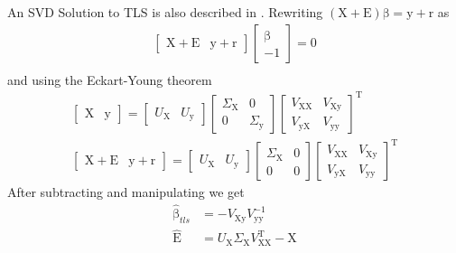 \documentclass[10pt,a4paper]{article}
\newcommand{\boldvec}[1]{\boldsymbol{\mathrm{#1}}}
\let\vec\boldvec
\newcommand{\designMat}{\vec{X}} %
\newcommand{\observations}{\vec{y}} %
\newcommand{\param}{\vec{\beta}} %
\newcommand{\residual}{\vec{r}} %
\newcommand{\errorMat}{\vec{E}} %
\begin{document}
An SVD Solution to TLS is also described in \cite{Golub80}. Rewriting $(\designMat + \errorMat)\param = \observations + \residual$ as  
%
\begin{equation}
\begin{aligned}
\begin{bmatrix} \designMat + \errorMat & \observations + \residual \end{bmatrix} \begin{bmatrix} \param \\ -1 \end{bmatrix} = 0 \\
\end{aligned}
\end{equation}
%
and using the Eckart-Young theorem
\begin{equation}
\begin{aligned}
\begin{bmatrix} \designMat & \observations \end{bmatrix} = \begin{bmatrix} U_{\designMat} & U_{\observations} \end{bmatrix} \begin{bmatrix} \Sigma_{\designMat} & 0 \\ 0 & \Sigma_{\observations} \end{bmatrix} \begin{bmatrix} V_{\designMat \designMat} & V_{\designMat \observations} \\ V_{\observations \designMat} & V_{\observations \observations} \end{bmatrix}^{\mathrm{T}} \\
\begin{bmatrix} \designMat + \errorMat & \observations + \residual \end{bmatrix} = \begin{bmatrix} U_{\designMat} & U_{\observations} \end{bmatrix} \begin{bmatrix} \Sigma_{\designMat} & 0 \\ 0 & 0 \end{bmatrix} \begin{bmatrix} V_{\designMat \designMat} & V_{\designMat \observations} \\ V_{\observations \designMat} & V_{\observations \observations} \end{bmatrix}^{\mathrm{T}}
\end{aligned}
\end{equation}
% 
After subtracting and manipulating we get
%
\begin{equation}
\begin{aligned}
\hat{\param}_{tls} &= -V_{\designMat \observations}V_{\observations \observations}^{-1} \\
\hat{\errorMat} &= U_{\designMat} \Sigma_{\designMat} V_{\designMat \designMat}^{\mathrm{T}} - \designMat
\end{aligned}
\end{equation}
\end{document}
